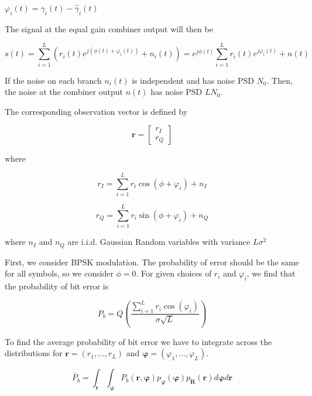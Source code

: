 \documentclass[fleqn]{article}
\begin{document}
\begin{enumerate}
		$\varphi_i(t) = \gamma_i(t) - \hat{\gamma}_i(t)$
		
		The signal at the equal gain combiner output will then be
		
		\begin{equation*}
			s(t) = \sum_{i=1}^{L}{\left(r_i(t)e^{j(\phi(t) + \varphi_i(t))}+n_i(t)\right)} = e^{j\phi(t)}\sum_{i=1}^{L}{r_i(t)e^{j\varphi_i(t)}} + n(t)
		\end{equation*}
		
		If the noise on each branch $n_i(t)$ is independent and has noise PSD $N_0$. Then, the noise at the combiner output $n(t)$ has noise PSD $LN_0$.
		
		The corresponding observation vector is defined by
		
		\begin{equation*}
			\mathbf{r} = \begin{bmatrix}
				r_I \\
				r_Q
			\end{bmatrix}
		\end{equation*}
		
		where
		
		\begin{equation*}
			r_I = \sum_{i=1}^{L}{r_i\cos(\phi + \varphi_i)} + n_I
		\end{equation*}
		
		\begin{equation*}
			r_Q = \sum_{i=1}^{L}{r_i\sin(\phi + \varphi_i)} + n_Q
		\end{equation*}
		
		where $n_I$ and $n_Q$ are i.i.d. Gaussian Random variables with variance $L\sigma^2$
		
		First, we consider BPSK modulation. The probability of error should be the same for all symbols, so we consider $\phi = 0$. For given choices of $r_i$ and $\varphi_i$, we find that the probability of bit error is
		
		\begin{equation*}
			P_b = Q\left(\frac{\sum_{i=1}^{L}{r_i\cos(\varphi_i)}}{\sigma\sqrt{L}}\right)
		\end{equation*}
		 
		To find the average probability of bit error we have to integrate across the distributions for $\mathbf{r} = (r_1,...,r_L)$ and $\boldsymbol{\varphi} = (\varphi_1,...,\varphi_L)$.
		
		\begin{equation*}
			\bar{P}_b = \int_{\mathbf{r}}{\int_{\boldsymbol{\varphi}}{P_b(\mathbf{r},\boldsymbol{\varphi})p_{\boldsymbol{\varphi}}(\boldsymbol{\varphi})p_{\mathbf{R}}(\mathbf{r})d\boldsymbol{\varphi}}d\mathbf{r}}
		\end{equation*}
		

\end{enumerate}
\end{document}
